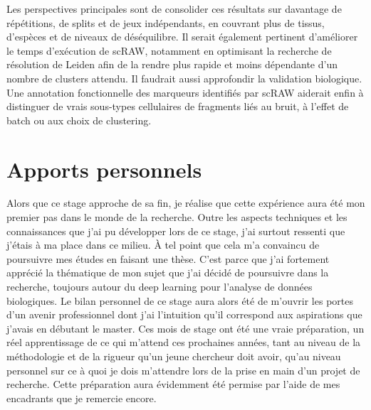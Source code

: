 Les perspectives principales sont de consolider ces résultats sur davantage de répétitions, de splits et de jeux indépendants, en couvrant plus de tissus, d'espèces et de niveaux de déséquilibre. Il serait également pertinent d'améliorer le temps d'exécution de scRAW, notamment en optimisant la recherche de résolution de Leiden afin de la rendre plus rapide et moins dépendante d'un nombre de clusters attendu. Il faudrait aussi approfondir la validation biologique. Une annotation fonctionnelle des marqueurs identifiés par scRAW aiderait enfin à distinguer de vrais sous-types cellulaires de fragments liés au bruit, à l'effet de batch ou aux choix de clustering.

\section*{Apports personnels}

Alors que ce stage approche de sa fin, je réalise que cette expérience aura été mon premier pas dans le monde de la recherche. Outre les aspects techniques et les connaissances que j'ai pu développer lors de ce stage, j'ai surtout ressenti que j'étais à ma place dans ce milieu. À tel point que cela m'a convaincu de poursuivre mes études en faisant une thèse. C'est parce que j'ai fortement apprécié la thématique de mon sujet que j'ai décidé de poursuivre dans la recherche, toujours autour du deep learning pour l'analyse de données biologiques. Le bilan personnel de ce stage aura alors été de m'ouvrir les portes d'un avenir professionnel dont j'ai l'intuition qu'il correspond aux aspirations que j'avais en débutant le master. Ces mois de stage ont été une vraie préparation, un réel apprentissage de ce qui m'attend ces prochaines années, tant au niveau de la méthodologie et de la rigueur qu'un jeune chercheur doit avoir, qu'au niveau personnel sur ce à quoi je dois m'attendre lors de la prise en main d'un projet de recherche. Cette préparation aura évidemment été permise par l'aide de mes encadrants que je remercie encore.
